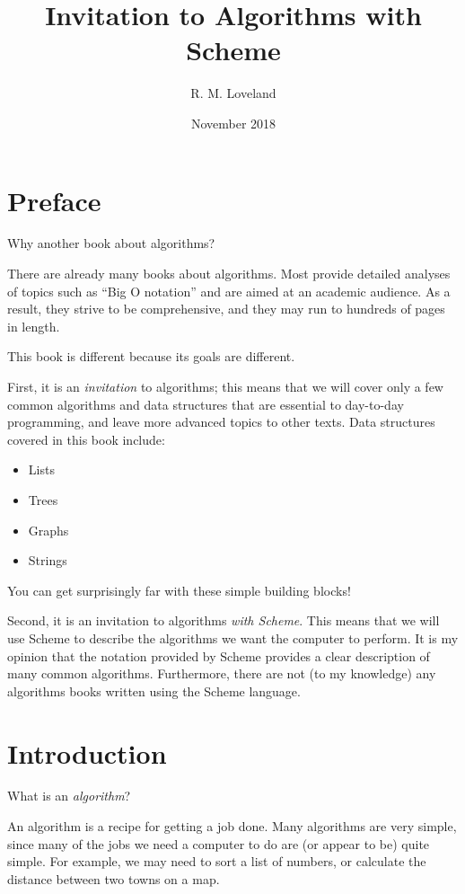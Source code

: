 \documentclass[12pt,openright,draft]{book}
\begin{document}
\title{Invitation to Algorithms with Scheme}
\author{R. M. Loveland}
\date{November 2018}

\frontmatter{}
\maketitle{}

\tableofcontents{}

\chapter{Preface}

Why another book about algorithms?

There are already many books about algorithms.  Most provide detailed
analyses of topics such as ``Big O notation'' and are aimed at an
academic audience.  As a result, they strive to be comprehensive, and
they may run to hundreds of pages in length.

This book is different because its goals are different.

First, it is an \emph{invitation} to algorithms; this means that we
will cover only a few common algorithms and data structures that are
essential to day-to-day programming, and leave more advanced topics to
other texts.  Data structures covered in this book include:

\begin{itemize}
\item Lists
\item Trees
\item Graphs
\item Strings
\end{itemize}

You can get surprisingly far with these simple building blocks!

Second, it is an invitation to algorithms \emph{with Scheme}.  This
means that we will use Scheme to describe the algorithms we want the
computer to perform.  It is my opinion that the notation provided by
Scheme provides a clear description of many common algorithms.
Furthermore, there are not (to my knowledge) any algorithms books
written using the Scheme language.

\chapter{Introduction}

What is an \emph{algorithm}?

An algorithm is a recipe for getting a job done.  Many algorithms are
very simple, since many of the jobs we need a computer to do are (or
appear to be) quite simple.  For example, we may need to sort a list
of numbers, or calculate the distance between two towns on a map.
\end{document}
